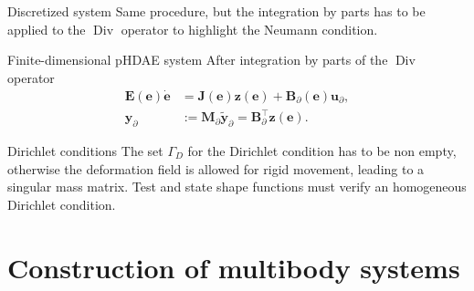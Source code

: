 \documentclass[aspectratio=169]{ISAE-Beamer}
\DeclareMathOperator*{\Div}{Div}
\begin{document}
\begin{frame}{Discretized system}
	Same procedure, but the integration by parts has to be applied to the $\Div$ operator to highlight the Neumann condition.
	\begin{exampleblock}{Finite-dimensional pHDAE system}
		\setlength{\abovedisplayskip}{3pt}
		\setlength{\belowdisplayskip}{3pt}
		After integration by parts of the $\Div$ operator
		\begin{equation*}
		\begin{aligned}
		\mathbf{E}(\mathbf{e}) \dot{\mathbf{e}} &= \mathbf{J}(\mathbf{e}) \mathbf{z}(\mathbf{e})+ \mathbf{B}_\partial(\mathbf{e}) \mathbf{u}_\partial, \\
		\mathbf{y}_\partial &:= \mathbf{M}_\partial \widetilde{\mathbf{y}}_\partial = \mathbf{B}_\partial^\top \mathbf{z}(\mathbf{e}).
		\end{aligned}
		\end{equation*}
	\end{exampleblock}
	
	\begin{block}{Dirichlet conditions}
		The set $\Gamma_D$ for the Dirichlet condition has to be non empty, otherwise the deformation field is allowed for rigid movement, leading to a singular mass matrix. Test and state shape functions must verify an homogeneous Dirichlet condition. 
	\end{block}
\end{frame}


\section{Construction of multibody systems}
\end{document}
